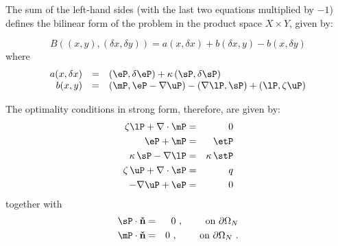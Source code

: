 The sum of the left-hand sides (with the last two equations multiplied by $-1$) defines the bilinear form of the problem in the product space $X \times Y$, given by:

\begin{equation}
	B((x,y),(\delta x,\delta y))=a(x,\delta x)+b(\delta x,y)-b(x,\delta y)
\end{equation}
where
\begin{equation}\label{eq:bform}
	\begin{array}{rcl}
		a(x,\delta x)&=& \left (\eP,\delta \eP \right )+\kappa \left ( \sP,\delta \sP \right ) \\
		b(x,y)& = & \left ( \mP,\eP-\nabla \uP \right )-\left (\nabla \lP,\sP\right ) + \left ( \lP, \zeta \uP \right )
	\end{array}
\end{equation}

The optimality conditions in strong form, therefore, are given by:
\begin{eqnarray}
	\zeta \lP  + \nabla \cdot \mP & = & 0 			\label{eq:dif1}\\
	 \eP + \mP & = & \etP 							\label{eq:dif2}\\
	\kappa\, \sP - \nabla \lP & = & \kappa\,\stP 	\label{eq:dif3}\\
	 \zeta\,\uP+\nabla \cdot \sP  & = & q 			\label{eq:dif4}\\
	-\nabla \uP + \eP &=& 0 						\label{eq:dif5}
\end{eqnarray}
together with
\begin{eqnarray}
 \sP \cdot \mathbf{\check{n}} & = & 0~,\qquad \mbox{ on } \partial \Omega_N \\
 \mP \cdot \mathbf{\check{n}} & = & 0~,\qquad \mbox{ on } \partial \Omega_N ~.
\end{eqnarray}

